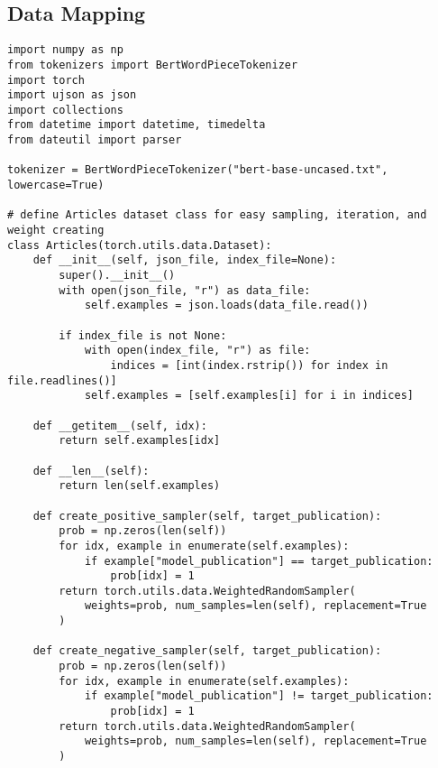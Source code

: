 \subsection{Data Mapping}
\begin{verbatim}
import numpy as np
from tokenizers import BertWordPieceTokenizer
import torch
import ujson as json
import collections
from datetime import datetime, timedelta
from dateutil import parser

tokenizer = BertWordPieceTokenizer("bert-base-uncased.txt", lowercase=True)

# define Articles dataset class for easy sampling, iteration, and weight creating
class Articles(torch.utils.data.Dataset):
    def __init__(self, json_file, index_file=None):
        super().__init__()
        with open(json_file, "r") as data_file:
            self.examples = json.loads(data_file.read())

        if index_file is not None:
            with open(index_file, "r") as file:
                indices = [int(index.rstrip()) for index in file.readlines()]
            self.examples = [self.examples[i] for i in indices]

    def __getitem__(self, idx):
        return self.examples[idx]

    def __len__(self):
        return len(self.examples)

    def create_positive_sampler(self, target_publication):
        prob = np.zeros(len(self))
        for idx, example in enumerate(self.examples):
            if example["model_publication"] == target_publication:
                prob[idx] = 1
        return torch.utils.data.WeightedRandomSampler(
            weights=prob, num_samples=len(self), replacement=True
        )

    def create_negative_sampler(self, target_publication):
        prob = np.zeros(len(self))
        for idx, example in enumerate(self.examples):
            if example["model_publication"] != target_publication:
                prob[idx] = 1
        return torch.utils.data.WeightedRandomSampler(
            weights=prob, num_samples=len(self), replacement=True
        )


\end{verbatim}
